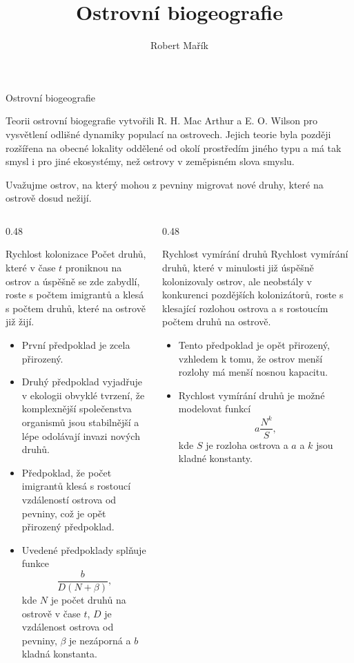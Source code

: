 \documentclass[handouts]{beamer}
\title{Ostrovní biogeografie}
\author{Robert Mařík}
\begin{document}
\begin{frame}

  \begin{center}
    \large Ostrovní biogeografie 
  \end{center}


  Teorii ostrovní biogegrafie vytvořili R. H. Mac Arthur a
  E. O. Wilson pro vysvětlení odlišné dynamiky populací na
  ostrovech. Jejich teorie byla později rozšířena na obecné lokality
  oddělené od okolí prostředím jiného typu a má tak smysl i pro jiné ekosystémy, než ostrovy v zeměpisném slova smyslu.

  \medskip
  Uvažujme ostrov, na který mohou z pevniny migrovat nové druhy, které
  na ostrově dosud nežijí.


  \begin{columns}
    \begin{column}[t]{0.48\hsize}
      \begin{block}{Rychlost kolonizace}
Počet druhů, které v čase
$t$ proniknou na ostrov a úspěšně se zde zabydlí, roste s počtem
imigrantů a klesá s počtem druhů, které na ostrově  již žijí.
\begin{itemize}
\item První
  předpoklad je zcela přirozený.
\item Druhý předpoklad vyjadřuje v ekologii obvyklé
tvrzení, že komplexnější společenstva organismů jsou stabilnější a lépe
odolávají invazi nových druhů.
\item  Předpoklad, že počet imigrantů klesá s rostoucí
vzdáleností ostrova od pevniny, což je opět přirozený  předpoklad.
\item  Uvedené předpoklady splňuje funkce
$$
 \frac b{D(N+\beta)},
$$
kde $N$ je počet druhů na ostrově v čase $t$, $D$ je vzdálenost ostrova od
pevniny, $\beta$ je nezáporná a  $b$ kladná konstanta. 
\end{itemize}
\end{block}
\end{column}
\begin{column}[t]{0.48\hsize}
  \begin{block}{Rychlost vymírání  druhů}
Rychlost vymírání  druhů, které v minulosti již úspěšně
kolonizovaly ostrov, ale neobstály v konkurenci pozdějších kolonizátorů,
roste s klesající rozlohou ostrova a s rostoucím počtem druhů na
ostrově.
\begin{itemize}
\item Tento předpoklad
je opět přirozený, vzhledem k tomu, že ostrov menší rozlohy má menší nosnou
kapacitu.
\item Rychlost vymírání druhů je možné modelovat funkcí
$$
 a\frac {N^k}S,
$$
kde $S$ je rozloha ostrova a $a$ a $k$ jsou kladné konstanty.
\end{itemize}
\end{block}
\end{column}
\end{columns}


\end{frame}
\end{document}
